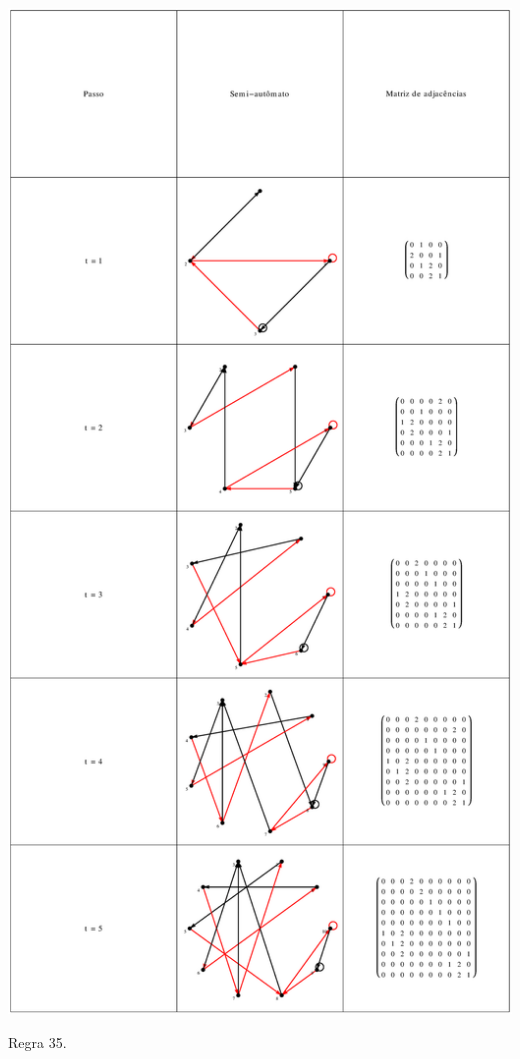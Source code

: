 \documentclass[12pt,a4paper]{article}
\begin{document}
\begin{table}[H]
\begin{center}
\includegraphics[scale=0.32]{img/mat/matr35.eps}
\caption{Regra 35.}
\label{tab:mr35}
\end{center}
\end{table}
\end{document}
